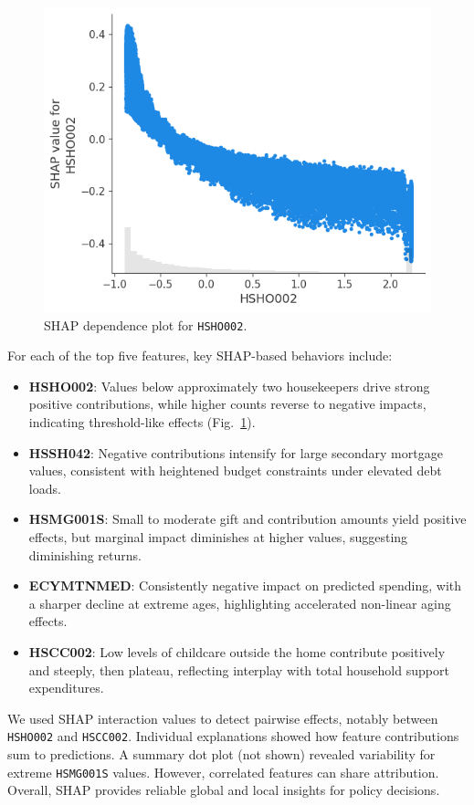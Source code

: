 \documentclass{article}
\begin{document}
\begin{figure}[ht]
  \centering
  \includegraphics[width=0.75\linewidth]{figures/shap_dependence_hsho002.png}
  \caption{SHAP dependence plot for \texttt{HSHO002}.}
  \label{fig:shap_hsho002}
\end{figure}

For each of the top five features, key SHAP-based behaviors include:
\begin{itemize}
  \item \textbf{HSHO002}: Values below approximately two housekeepers drive strong positive contributions, while higher counts reverse to negative impacts, indicating threshold-like effects (Fig.~\ref{fig:shap_hsho002}).
  \item \textbf{HSSH042}: Negative contributions intensify for large secondary mortgage values, consistent with heightened budget constraints under elevated debt loads.
  \item \textbf{HSMG001S}: Small to moderate gift and contribution amounts yield positive effects, but marginal impact diminishes at higher values, suggesting diminishing returns.
  \item \textbf{ECYMTNMED}: Consistently negative impact on predicted spending, with a sharper decline at extreme ages, highlighting accelerated non-linear aging effects.
  \item \textbf{HSCC002}: Low levels of childcare outside the home contribute positively and steeply, then plateau, reflecting interplay with total household support expenditures.
\end{itemize}

We used SHAP interaction values to detect pairwise effects, notably between \texttt{HSHO002} and \texttt{HSCC002}. Individual explanations showed how feature contributions sum to predictions. A summary dot plot (not shown) revealed variability for extreme \texttt{HSMG001S} values. However, correlated features can share attribution. Overall, SHAP provides reliable global and local insights for policy decisions.
\end{document}

